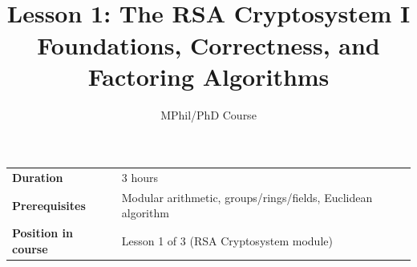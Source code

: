 \documentclass[11pt]{article}
\title{\textbf{\seriestitle} \\ \Large Lesson 1: The RSA Cryptosystem I \\ \large Foundations, Correctness, and Factoring Algorithms}
\author{MPhil/PhD Course}
\date{}
\begin{document}
\maketitle

\begin{center}
\begin{tabular}{ll}
\toprule
\textbf{Duration} & 3 hours \\
\textbf{Prerequisites} & Modular arithmetic, groups/rings/fields, Euclidean algorithm \\
\textbf{Position in course} & Lesson 1 of 3 (RSA Cryptosystem module) \\
\bottomrule
\end{tabular}
\end{center}



\end{document}
